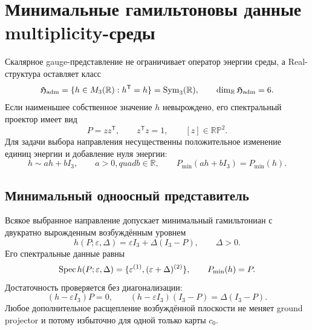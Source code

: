 \chapter{Минимальные гамильтоновы данные multiplicity-среды}
\label{ch:v8-baryon-c0-multiplicity-environment-hamiltonian-minimal-data-gate}

Скалярное gauge-представление не ограничивает оператор энергии среды, а
Real-структура оставляет класс
\begin{equation}
 \mathfrak H_{\rm adm}
 =\{h\in M_3(\mathbb R):h^{\mathsf T}=h\}
 =\operatorname{Sym}_3(\mathbb R),
 \qquad \dim_{\mathbb R}\mathfrak H_{\rm adm}=6.
 \label{eq:v8-baryon-c0-admissible-environment-hamiltonians}
\end{equation}
Если наименьшее собственное значение $h$ невырождено, его спектральный
проектор имеет вид
\begin{equation}
 P=zz^{\mathsf T},
 \qquad z^{\mathsf T}z=1,
 \qquad [z]\in\mathbb{RP}^2.
 \label{eq:v8-baryon-c0-hamiltonian-ground-projector}
\end{equation}
Для задачи выбора направления несущественны положительное изменение
единиц энергии и добавление нуля энергии:
\begin{equation}
 h\sim ah+bI_3,
 \qquad a>0,quad b\in\mathbb R,
 \qquad P_{\min}(ah+bI_3)=P_{\min}(h).
 \label{eq:v8-baryon-c0-ground-projector-affine-equivalence}
\end{equation}

\section{Минимальный одноосный представитель}

Всякое выбранное направление допускает минимальный гамильтониан с
двукратно вырожденным возбуждённым уровнем
\begin{equation}
 h(P;\varepsilon,\Delta)
 =\varepsilon I_3+\Delta(I_3-P),
 \qquad \Delta>0.
 \label{eq:v8-baryon-c0-minimal-axial-environment-hamiltonian}
\end{equation}
Его спектральные данные равны
\begin{equation}
 \operatorname{Spec} h(P;\varepsilon,\Delta)
 =\{\varepsilon^{(1)},(\varepsilon+\Delta)^{(2)}\},
 \qquad P_{\min}(h)=P.
 \label{eq:v8-baryon-c0-minimal-axial-hamiltonian-spectrum}
\end{equation}
Достаточность проверяется без диагонализации:
\begin{equation}
 (h-\varepsilon I_3)P=0,
 \qquad
 (h-\varepsilon I_3)(I_3-P)=\Delta(I_3-P).
 \label{eq:v8-baryon-c0-axial-hamiltonian-projector-identities}
\end{equation}
Любое дополнительное расщепление возбуждённой плоскости не меняет ground
projector и потому избыточно для одной только карты $c_0$.


